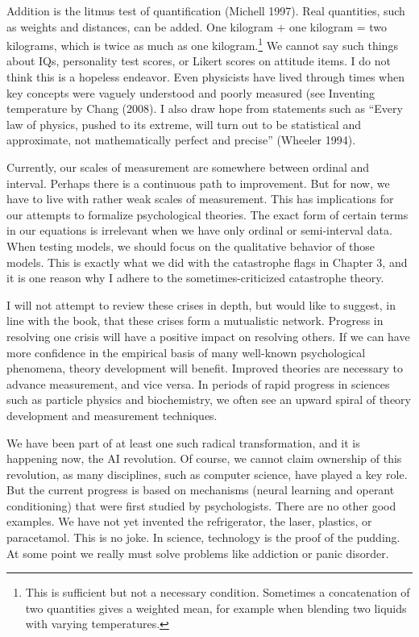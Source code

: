 \documentclass[
  letterpaper,
]{scrbook}
\begin{document}
Addition is the litmus test of quantification (Michell 1997). Real
quantities, such as weights and distances, can be added. One kilogram +
one kilogram = two kilograms, which is twice as much as one
kilogram.\footnote{This is sufficient but not a necessary condition.
  Sometimes a concatenation of two quantities gives a weighted mean, for
  example when blending two liquids with varying temperatures.} We
cannot say such things about IQs, personality test scores, or Likert
scores on attitude items. I do not think this is a hopeless endeavor.
Even physicists have lived through times when key concepts were vaguely
understood and poorly measured (see Inventing temperature by Chang
(2008). I also draw hope from statements such as ``Every law of physics,
pushed to its extreme, will turn out to be statistical and approximate,
not mathematically perfect and precise'' (Wheeler 1994).

Currently, our scales of measurement are somewhere between ordinal and
interval. Perhaps there is a continuous path to improvement. But for
now, we have to live with rather weak scales of measurement. This has
implications for our attempts to formalize psychological theories. The
exact form of certain terms in our equations is irrelevant when we have
only ordinal or semi-interval data. When testing models, we should focus
on the qualitative behavior of those models. This is exactly what we did
with the catastrophe flags in Chapter 3, and it is one reason why I
adhere to the sometimes-criticized catastrophe theory.

I will not attempt to review these crises in depth, but would like to
suggest, in line with the book, that these crises form a mutualistic
network. Progress in resolving one crisis will have a positive impact on
resolving others. If we can have more confidence in the empirical basis
of many well-known psychological phenomena, theory development will
benefit. Improved theories are necessary to advance measurement, and
vice versa. In periods of rapid progress in sciences such as particle
physics and biochemistry, we often see an upward spiral of theory
development and measurement techniques.

We have been part of at least one such radical transformation, and it is
happening now, the AI revolution. Of course, we cannot claim ownership
of this revolution, as many disciplines, such as computer science, have
played a key role. But the current progress is based on mechanisms
(neural learning and operant conditioning) that were first studied by
psychologists. There are no other good examples. We have not yet
invented the refrigerator, the laser, plastics, or paracetamol. This is
no joke. In science, technology is the proof of the pudding. At some
point we really must solve problems like addiction or panic disorder.
\end{document}
